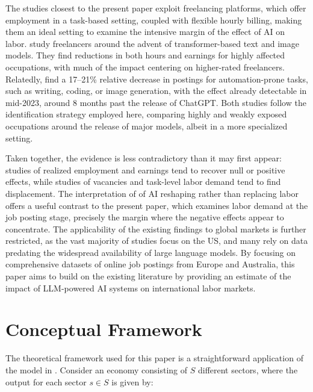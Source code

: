 \documentclass[11pt]{article}
\begin{document}
The studies closest to the present paper exploit freelancing platforms, which offer employment in a task-based setting, coupled with flexible hourly billing, making them an ideal setting to examine the intensive margin of the effect of AI on labor. \citet{hui2023shortterm} study freelancers around the advent of transformer-based text and image models. They find reductions in both hours and earnings for highly affected occupations, with much of the impact centering on higher-rated freelancers. Relatedly, \citet{demirci2025replacing} find a 17--21\% relative decrease in postings for automation-prone tasks, such as writing, coding, or image generation, with the effect already detectable in mid-2023, around 8 months past the release of ChatGPT. Both studies follow the identification strategy employed here, comparing highly and weakly exposed occupations around the release of major models, albeit in a more specialized setting.

Taken together, the evidence is less contradictory than it may first appear: studies of realized employment and earnings tend to recover null or positive effects, while studies of vacancies and task-level labor demand tend to find displacement. The interpretation of \citet{humlum2025stillwaters} of AI reshaping rather than replacing labor offers a useful contrast to the present paper, which examines labor demand at the job posting stage, precisely the margin where the negative effects appear to concentrate. The applicability of the existing findings to global markets is further restricted, as the vast majority of studies focus on the US, and many rely on data predating the widespread availability of large language models. By focusing on comprehensive datasets of online job postings from Europe and Australia, this paper aims to build on the existing literature by providing an estimate of the impact of LLM-powered AI systems on international labor markets.


\section{Conceptual Framework}
\label{sec:framework}

The theoretical framework used for this paper is a straightforward application of the model in \citet{acemoglu_restrepo_2022}. Consider an economy consisting of $S$ different sectors, where the output for each sector $s\in S$ is given by:
\end{document}
